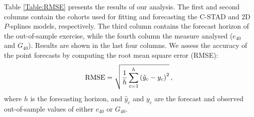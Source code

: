\documentclass[11pt, a4paper]{article}
\begin{document}

Table \ref{Table:RMSE} presents the results of our analysis. The first and second columns contain the cohorts used for fitting and forecasting the C-STAD and 2D $P$-splines models, respectively. The third column contains the forecast horizon of the out-of-sample exercise, while the fourth column the measure analysed ($e_{40}$ and $G_{40}$). Results are shown in the last four columns. We assess the accuracy of the point forecasts by computing the root mean square error (RMSE):
%
\begin{equation}\label{Eq:RMSE}
\mathrm{RMSE}=\sqrt{\frac{1}{h} \sum_{c=1}^{h} \left(\hat{y}_c-y_c\right)^2} \, , \notag
\end{equation} 
%
where $h$ is the forecasting horizon, and $\hat{y}_c$ and $y_c$ are the forecast and observed out-of-sample values of either $e_{40}$ or $G_{40}$. 
\end{document}
